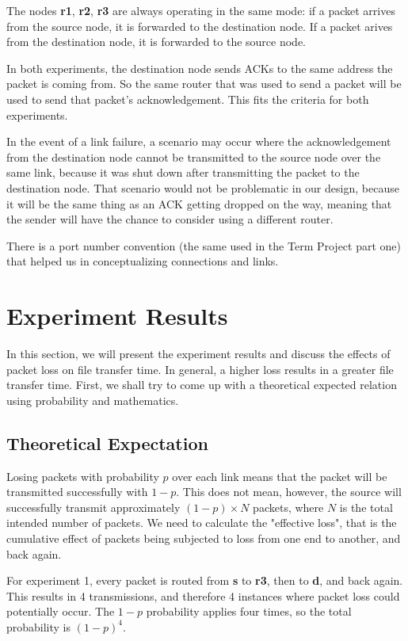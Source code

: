 \documentclass[conference]{IEEEtran}
\begin{document}
The nodes \textbf{r1}, \textbf{r2}, \textbf{r3} are always operating in the same mode: if a packet
arrives from the source node, it is forwarded to the destination node. If a packet arives from the
destination node, it is forwarded to the source node.

In both experiments, the destination node sends ACKs to the same address the packet is coming from. So
the same router that was used to send a packet will be used to send that packet's acknowledgement. This
fits the criteria for both experiments.

In the event of a link failure, a scenario may occur where the acknowledgement from the destination
node cannot be transmitted to the source node over the same link, because it was shut down after
transmitting the packet to the destination node. That scenario would not be problematic in our
design, because it will be the same thing as an ACK getting dropped on the way, meaning that the
sender will have the chance to consider using a different router.

There is a port number convention (the same used in the Term Project part one) that helped us in
conceptualizing connections and links.


\section{Experiment Results}

In this section, we will present the experiment results and discuss the effects of packet loss
on file transfer time. In general, a higher loss results in a greater file transfer time. First,
we shall try to come up with a theoretical expected relation using probability and mathematics.

\subsection{Theoretical Expectation}

Losing packets with probability $p$ over each link means that the packet will be transmitted
successfully with $1 - p$. This does not mean, however, the source will successfully transmit
approximately $(1-p) \times N$ packets, where $N$ is the total intended number of packets. We
need to calculate the "effective loss", that is the cumulative effect of packets being subjected
to loss from one end to another, and back again.

For experiment 1, every packet is routed from \textbf{s} to \textbf{r3}, then to \textbf{d}, and
back again. This results in 4 transmissions, and therefore 4 instances where packet loss could
potentially occur. The $1-p$ probability applies four times, so the total probability is
$(1-p)^4$.
\end{document}
